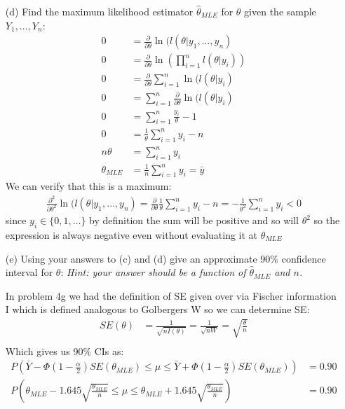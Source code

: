 \documentclass{article}
\newcommand{\1}{\mathbf{1}}
\begin{document}
\begin{itemize}
    \item[(d)]  Find the maximum likelihood estimator $\hat{\theta}_{MLE}$ for $\theta$ given the sample $Y_1,\ldots, Y_n$:
    \begin{align*}
        0 &= \frac{\partial}{\partial\theta} \ln(l(\theta|y_1,\hdots ,y_n) \\
        0 &= \frac{\partial}{\partial\theta} \ln\left( \prod_{i=1}^n l(\theta|y_i) \right) \\
        0 &= \frac{\partial}{\partial\theta} \sum_{i=1}^n \ln(l(\theta|y_i) \\
        0 &= \sum_{i=1}^n \frac{\partial}{\partial\theta} \ln(l(\theta|y_i) \\
        0 &= \sum_{i=1}^n \frac{y_i}{\theta} -1 \\
        0 &= \frac{1}{\theta} \sum_{i=1}^n y_i - n \\
        n\theta  &= \sum_{i=1}^n y_i \\
        \theta_{MLE} &= \frac{1}{n} \sum_{i=1}^n y_i = \bar y 
    \end{align*}
    We can verify that this is a maximum:
    \begin{align*}
        \frac{\partial^2}{\partial\theta^2} \ln(l(\theta|y_1,\hdots ,y_n) =   \frac{\partial}{\partial\theta} \frac{1}{\theta} \sum_{i=1}^n y_i - n = -\frac{1}{\theta^2} \sum_{i=1}^n y_i < 0
    \end{align*}
    since $y_i \in \{0,1,\ldots \}$ by definition the sum will be positive and so will $\theta^2$ so the expression is always negative even without evaluating it at $\theta_{MLE}$

    \item[(e)]  Using your answers to (c) and (d) give an approximate $90\%$ confidence interval for $\theta$: {\it Hint: your answer should be a function of $\hat{\theta}_{MLE}$ and $n$.}
    
    In problem 4g we had the definition of SE given over via Fischer information I which is defined analogous to Golbergers W so we can determine SE:
    \begin{align*}
        SE(\theta) &= \frac{1}{\sqrt{nI(\theta)}} = \frac{1}{\sqrt{nW}} = \sqrt{\frac{\theta}{n}}\\
    \end{align*}
    Which gives us 90\% CIs as:
    \begin{align*}
        P\left(\bar Y - \Phi\left(1-\frac{\alpha}{2}\right)SE(\theta_{MLE}) \leq \mu \leq \bar Y + \Phi\left(1-\frac{\alpha}{2}\right)SE(\theta_{MLE})\right) &= 0.90 \\
        P\left(\theta_{MLE} - 1.645  \sqrt{\frac{\theta_{MLE}}{n}} \leq \mu \leq \theta_{MLE}  + 1.645 \sqrt{\frac{\theta_{MLE}}{n}}\right) &= 0.90
    \end{align*} 
\end{itemize}
\end{document}
